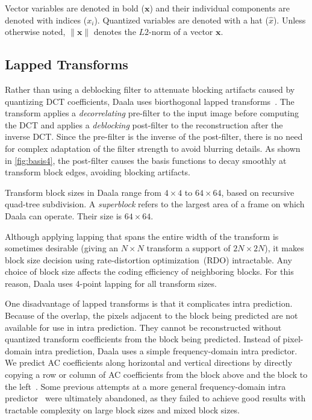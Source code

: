 \documentclass[english,conference,10pt]{IEEEtran}
\begin{document}
Vector variables are
denoted in bold ($\mathbf{x}$) and their individual components are denoted
with indices ($x_i$). Quantized variables are denoted with a hat ($\hat{x}$).
Unless otherwise noted, $\|\mathbf{x}\|$ denotes the $L2$-norm of a vector
$\mathbf{x}$.

\subsection{Lapped Transforms}
\label{sec:lapping}

Rather than using a deblocking filter to attenuate blocking artifacts caused
by quantizing DCT coefficients, Daala uses biorthogonal lapped
transforms~\cite{MalvarS89,Tran2003}. The transform applies
a \textit{decorrelating} pre-filter to the input image before computing
the DCT and applies a \textit{deblocking} post-filter to the reconstruction
after the inverse DCT\@. Since the pre-filter is the inverse of the post-filter,
there is no need for complex adaptation of the filter strength to avoid blurring
details. As shown in \cref{fig:basis4}, the post-filter causes the basis functions
to decay smoothly at transform block edges, avoiding blocking artifacts.

Transform block sizes in Daala range from $4 \times 4$
to $64 \times 64$, based on recursive quad-tree subdivision. A
\textit{superblock} refers to the largest area of a frame on which Daala
can operate. Their size is $64\times 64$.

Although applying lapping that spans the entire width of the transform is
sometimes desirable (giving an $N \times N$ transform a support of $2N \times 2N$),
it makes block size decision using rate-distortion optimization~(RDO) intractable.
Any choice of block size affects the coding efficiency of neighboring blocks. For
this reason, Daala uses 4-point lapping for all transform sizes.

One disadvantage of lapped transforms is that it complicates intra prediction.
Because of the overlap, the pixels adjacent to the block being predicted are not
available for use in intra prediction. They cannot be reconstructed
without quantized transform coefficients from the block being predicted.
Instead of pixel-domain intra prediction, Daala uses a simple
frequency-domain intra predictor. We predict AC coefficients along horizontal
and vertical directions by directly copying a row or column of AC
coefficients from the block above and the block to the left~\cite{EggePCS}.
Some previous attempts at a more general
frequency-domain intra predictor~\cite{fdintra-demo} were ultimately abandoned,
as they failed to achieve good results with tractable complexity on large block
sizes and mixed block sizes.
\end{document}

